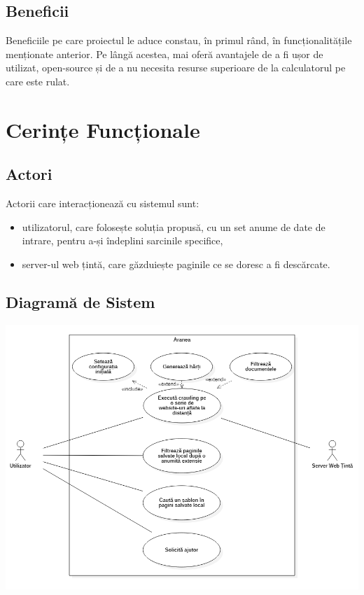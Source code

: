 \documentclass[12pt]{article}
\begin{document}
\subsection{Beneficii}

Beneficiile pe care proiectul le aduce constau, în primul rând, în funcționalitățile menționate anterior. Pe lângă acestea, mai oferă avantajele de a fi ușor de utilizat, open-source și de a nu necesita resurse superioare de la calculatorul pe care este rulat.

\newpage

\section{Cerințe Funcționale}

\subsection{Actori}

Actorii care interacționează cu sistemul sunt:
\begin{itemize}
    \item utilizatorul, care folosește soluția propusă, cu un set anume de date de intrare, pentru a-și îndeplini sarcinile specifice,
    \item server-ul web țintă, care găzduiește paginile ce se doresc a fi descărcate.
\end{itemize}

\subsection{Diagramă de Sistem}

\begin{center}
\includegraphics[width=15cm]{Use-case Diagram.png}
\end{center}
\end{document}
